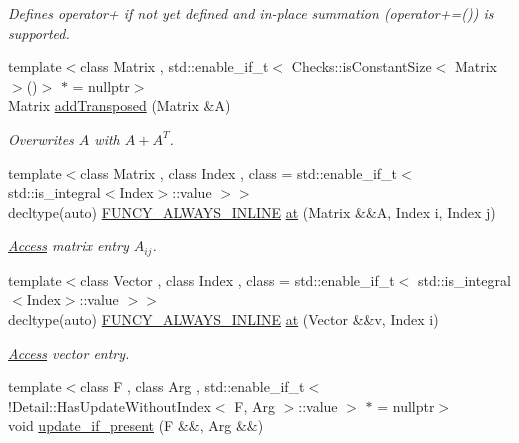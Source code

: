 \begin{DoxyCompactItemize}
\begin{DoxyCompactList}\small\item\em Defines operator+ if not yet defined and in-\/place summation (operator+=()) is supported. \end{DoxyCompactList}\item 
{\footnotesize template$<$class Matrix , std\-::enable\-\_\-if\-\_\-t$<$ Checks\-::is\-Constant\-Size$<$ Matrix $>$()$>$ $\ast$  = nullptr$>$ }\\Matrix \hyperlink{namespacefuncy_a97683bec7918af0786178e7c9ec9f244}{add\-Transposed} (Matrix \&A)
\begin{DoxyCompactList}\small\item\em Overwrites $A$ with $A+A^T$. \end{DoxyCompactList}\item 
{\footnotesize template$<$class Matrix , class Index , class  = std\-::enable\-\_\-if\-\_\-t$<$ std\-::is\-\_\-integral$<$\-Index$>$\-::value $>$$>$ }\\decltype(auto) \hyperlink{macros_8hh_aeb0da27a25e923327d595a79f556281d}{F\-U\-N\-C\-Y\-\_\-\-A\-L\-W\-A\-Y\-S\-\_\-\-I\-N\-L\-I\-N\-E} \hyperlink{namespacefuncy_a1a543c0f61343fa69a250819fd87069a}{at} (Matrix \&\&A, Index i, Index j)
\begin{DoxyCompactList}\small\item\em \hyperlink{namespacefuncy_1_1Access}{Access} matrix entry $A_{ij}$. \end{DoxyCompactList}\item 
{\footnotesize template$<$class Vector , class Index , class  = std\-::enable\-\_\-if\-\_\-t$<$ std\-::is\-\_\-integral$<$\-Index$>$\-::value $>$$>$ }\\decltype(auto) \hyperlink{macros_8hh_aeb0da27a25e923327d595a79f556281d}{F\-U\-N\-C\-Y\-\_\-\-A\-L\-W\-A\-Y\-S\-\_\-\-I\-N\-L\-I\-N\-E} \hyperlink{namespacefuncy_a2e348eb0fe3b971cdf77bdcf8201c7fe}{at} (Vector \&\&v, Index i)
\begin{DoxyCompactList}\small\item\em \hyperlink{namespacefuncy_1_1Access}{Access} vector entry. \end{DoxyCompactList}\item 
{\footnotesize template$<$class F , class Arg , std\-::enable\-\_\-if\-\_\-t$<$!\-Detail\-::\-Has\-Update\-Without\-Index$<$ F, Arg $>$\-::value $>$ $\ast$  = nullptr$>$ }\\void \hyperlink{namespacefuncy_a194c43494e614dfa1f924cf2893860ae}{update\-\_\-if\-\_\-present} (F \&\&, Arg \&\&)

\end{DoxyCompactItemize}
